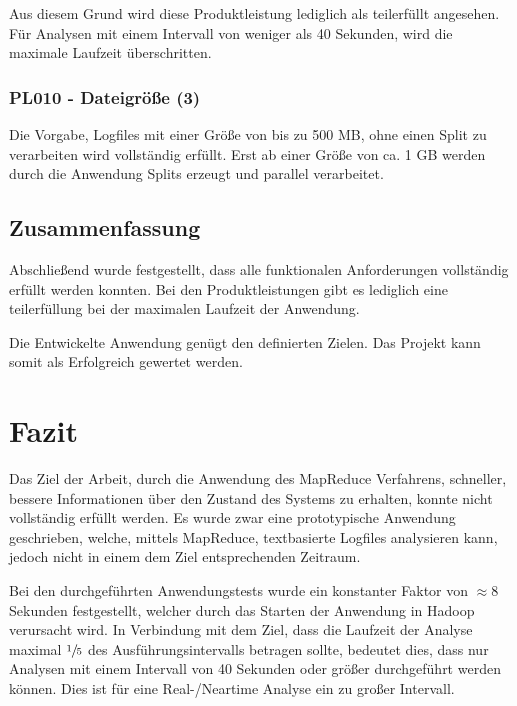 Aus diesem Grund wird diese Produktleistung lediglich als teilerfüllt angesehen. Für Analysen mit einem Intervall von weniger als 40 Sekunden, wird die maximale Laufzeit überschritten.

\subsubsection{PL010 - Dateigröße (3)}
Die Vorgabe, Logfiles mit einer Größe von bis zu 500 \ac{MB}, ohne einen Split zu verarbeiten wird vollständig erfüllt. Erst ab einer Größe von ca. 1 \ac{GB} werden durch die Anwendung Splits erzeugt und parallel verarbeitet. 

\subsection{Zusammenfassung}
Abschließend wurde festgestellt, dass alle funktionalen Anforderungen vollständig erfüllt werden konnten. Bei den Produktleistungen gibt es lediglich eine teilerfüllung bei der maximalen Laufzeit der Anwendung.

Die Entwickelte Anwendung genügt den definierten Zielen. Das Projekt kann somit als Erfolgreich gewertet werden. 



\newpage
\section{Fazit}\label{sec:Fazit}
Das Ziel der Arbeit, durch die Anwendung des MapReduce Verfahrens, schneller, bessere Informationen über den Zustand des Systems zu erhalten, konnte nicht vollständig erfüllt werden. Es wurde zwar eine prototypische Anwendung geschrieben, welche, mittels MapReduce, textbasierte Logfiles analysieren kann, jedoch nicht in einem dem Ziel entsprechenden Zeitraum.

Bei den durchgeführten Anwendungstests wurde ein konstanter Faktor von $\approx 8$ Sekunden festgestellt, welcher durch das Starten der Anwendung in Hadoop verursacht wird. In Verbindung mit dem Ziel, dass die Laufzeit der Analyse maximal $\sfrac{1}{5}$ des Ausführungsintervalls betragen sollte, bedeutet dies, dass nur Analysen mit einem Intervall von 40 Sekunden oder größer durchgeführt werden können. Dies ist für eine Real-/Neartime Analyse ein zu großer Intervall.

